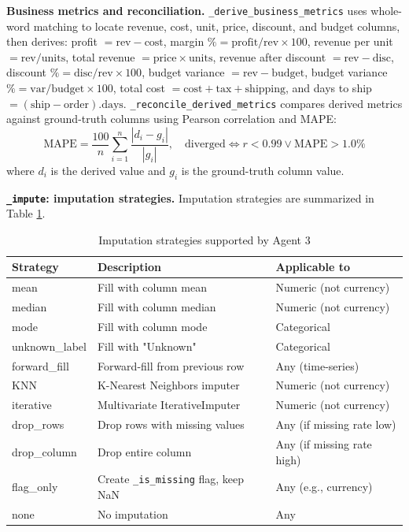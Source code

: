 \documentclass[12pt,a4paper,openany]{report}
\begin{document}
\textbf{Business metrics and reconciliation.} \texttt{\_derive\_business\_metrics} uses whole-word matching to locate revenue, cost, unit, price, discount, and budget columns, then derives: profit $= \text{rev} - \text{cost}$, margin $\% = \text{profit}/\text{rev} \times 100$, revenue per unit $= \text{rev}/\text{units}$, total revenue $= \text{price} \times \text{units}$, revenue after discount $= \text{rev} - \text{disc}$, discount $\% = \text{disc}/\text{rev} \times 100$, budget variance $= \text{rev} - \text{budget}$, budget variance $\% = \text{var}/\text{budget} \times 100$, total cost $= \text{cost} + \text{tax} + \text{shipping}$, and days to ship $= (\text{ship} - \text{order}).\text{days}$. \texttt{\_reconcile\_derived\_metrics} compares derived metrics against ground-truth columns using Pearson correlation and MAPE:
\begin{equation}
\text{MAPE} = \frac{100}{n}\sum_{i=1}^{n}\frac{|d_i - g_i|}{|g_i|}, \quad \text{diverged} \iff r < 0.99 \lor \text{MAPE} > 1.0\%
\label{eq:mape}
\end{equation}
where $d_i$ is the derived value and $g_i$ is the ground-truth column value.

\textbf{\texttt{\_impute}: imputation strategies.} Imputation strategies are summarized in Table \ref{tab:imputation-strategies}.

\begin{table}[H]
\centering
\caption{Imputation strategies supported by Agent 3}
\label{tab:imputation-strategies}
\begin{tabular}{p{3cm} p{6cm} p{3cm}}
\hline
Strategy & Description & Applicable to \\
\hline
mean & Fill with column mean & Numeric (not currency) \\
median & Fill with column median & Numeric (not currency) \\
mode & Fill with column mode & Categorical \\
unknown\_label & Fill with "Unknown" & Categorical \\
forward\_fill & Forward-fill from previous row & Any (time-series) \\
KNN & K-Nearest Neighbors imputer & Numeric (not currency) \\
iterative & Multivariate IterativeImputer & Numeric (not currency) \\
drop\_rows & Drop rows with missing values & Any (if missing rate low) \\
drop\_column & Drop entire column & Any (if missing rate high) \\
flag\_only & Create \texttt{\_is\_missing} flag, keep NaN & Any (e.g., currency) \\
none & No imputation & Any \\
\hline
\end{tabular}
\end{table}
\end{document}
